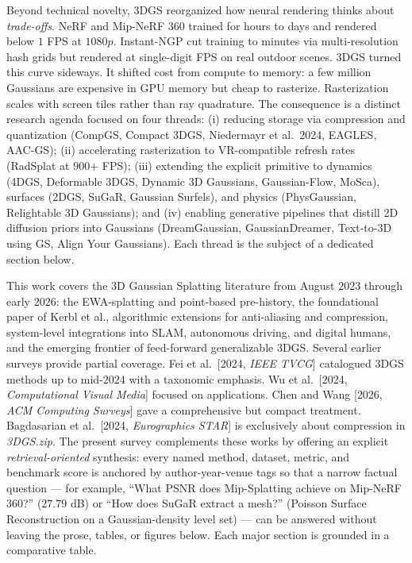 \documentclass{article}
\begin{document}
Beyond technical novelty, 3DGS reorganized how neural rendering thinks about \emph{trade-offs}. NeRF and Mip-NeRF 360 trained for hours to days and rendered below \(1\) FPS at \(1080p\). Instant-NGP \cite{mller2022instantneuralgraph} cut training to minutes via multi-resolution hash grids but rendered at single-digit FPS on real outdoor scenes. 3DGS turned this curve sideways. It shifted cost from compute to memory: a few million Gaussians are expensive in GPU memory but cheap to rasterize. Rasterization scales with screen tiles rather than ray quadrature. The consequence is a distinct research agenda focused on four threads: (i) reducing storage via compression and quantization (CompGS, Compact 3DGS, Niedermayr et al.~2024, EAGLES, AAC-GS); (ii) accelerating rasterization to VR-compatible refresh rates (RadSplat at \(900\)+ FPS); (iii) extending the explicit primitive to dynamics (4DGS, Deformable 3DGS, Dynamic 3D Gaussians, Gaussian-Flow, MoSca), surfaces (2DGS, SuGaR, Gaussian Surfels), and physics (PhysGaussian, Relightable 3D Gaussians); and (iv) enabling generative pipelines that distill 2D diffusion priors into Gaussians (DreamGaussian, GaussianDreamer, Text-to-3D using GS, Align Your Gaussians). Each thread is the subject of a dedicated section below.

This work covers the 3D Gaussian Splatting literature from August \(2023\) through early \(2026\): the EWA-splatting and point-based pre-history, the foundational paper of Kerbl et al., algorithmic extensions for anti-aliasing and compression, system-level integrations into SLAM, autonomous driving, and digital humans, and the emerging frontier of feed-forward generalizable 3DGS. Several earlier surveys provide partial coverage. Fei et al.~{[}2024, \emph{IEEE TVCG}{]} catalogued 3DGS methods up to mid-\(2024\) with a taxonomic emphasis. Wu et al.~{[}2024, \emph{Computational Visual Media}{]} focused on applications. Chen and Wang {[}2026, \emph{ACM Computing Surveys}{]} gave a comprehensive but compact treatment. Bagdasarian et al.~{[}2024, \emph{Eurographics STAR}{]} is exclusively about compression in \emph{3DGS.zip}. The present survey complements these works by offering an explicit \emph{retrieval-oriented} synthesis: every named method, dataset, metric, and benchmark score is anchored by author-year-venue tags so that a narrow factual question --- for example, ``What PSNR does Mip-Splatting achieve on Mip-NeRF 360?'' (\(27.79\) dB) or ``How does SuGaR extract a mesh?'' (Poisson Surface Reconstruction on a Gaussian-density level set) --- can be answered without leaving the prose, tables, or figures below. Each major section is grounded in a comparative table.
\end{document}
